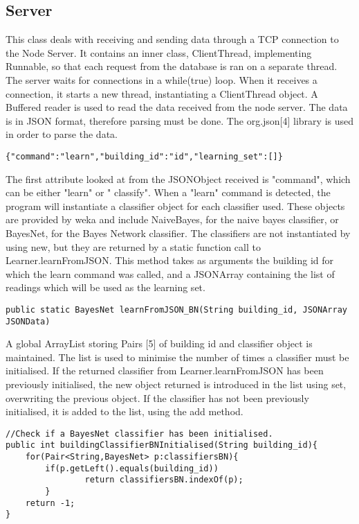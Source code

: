 \subsection{Server}
This class deals with receiving and sending data through a TCP connection to the Node Server. 
It contains an inner class, ClientThread, implementing Runnable, so that each request from the database is ran on a separate thread. The server waits for connections in a while(true) loop. When it receives a connection, it starts a new thread, instantiating a ClientThread object. A Buffered reader is used to read the data received from the node server. The data is in JSON format, therefore parsing must be done. The org.json[4] library is used in order to parse the data. 
\begin{lstlisting} 
{"command":"learn","building_id":"id","learning_set":[]}
\end{lstlisting}
The first attribute looked at from the JSONObject received is "command", which can be either "learn" or " classify". 
When a "learn" command is detected, the program will instantiate a classifier object for each classifier used. These objects are provided by weka and include NaiveBayes, for the naive bayes classifier, or BayesNet, for the Bayes Network classifier. 
The classifiers are not instantiated by using new, but they are returned by a static function call to Learner.learnFromJSON. This method takes as arguments the building id for which the learn command was called, and a JSONArray containing the list of readings which will be used as the learning set. 
\begin{lstlisting} 
public static BayesNet learnFromJSON_BN(String building_id, JSONArray JSONData)
\end{lstlisting}
 A global ArrayList storing Pairs [5] of building id and classifier object is maintained. The list is used to minimise the number of times a classifier must be initialised. If the returned classifier from Learner.learnFromJSON has been previously initialised, the new object returned is introduced in the list using set, overwriting the previous object. If the classifier has not been previously initialised, it is added to the list, using the add method. 
\begin{lstlisting}
//Check if a BayesNet classifier has been initialised.	
public int buildingClassifierBNInitialised(String building_id){
	for(Pair<String,BayesNet> p:classifiersBN){
		if(p.getLeft().equals(building_id))
        		return classifiersBN.indexOf(p);
        }
    return -1;
}    
\end{lstlisting}

